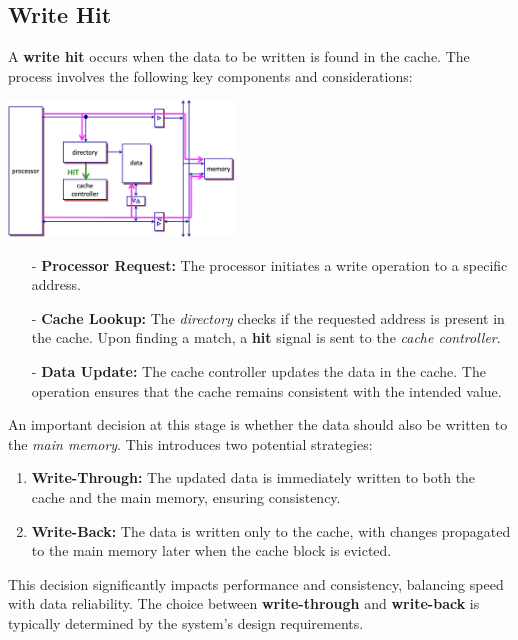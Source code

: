 \subsection{Write Hit}
A \textbf{write hit} occurs when the data to be written is found in the cache. The process involves the following key components and considerations:
\begin{center}
    \includegraphics[width=0.45\textwidth]{chapters/chapter3a/images/write_hit.png}
\end{center}

\begin{itemize}
    \item[-] \textbf{Processor Request:} The processor initiates a write operation to a specific address.
    \item[-] \textbf{Cache Lookup:} The \textit{directory} checks if the requested address is present in the cache. Upon finding a match, a \textbf{hit} signal is sent to the \textit{cache controller}.
    \item[-] \textbf{Data Update:} The cache controller updates the data in the cache. The operation ensures that the cache remains consistent with the intended value.
\end{itemize}

An important decision at this stage is whether the data should also be written to the \textit{main memory}. This introduces two potential strategies:
\begin{enumerate}
    \item \textbf{Write-Through:} The updated data is immediately written to both the cache and the main memory, ensuring consistency.
    \item \textbf{Write-Back:} The data is written only to the cache, with changes propagated to the main memory later when the cache block is evicted.
\end{enumerate}
This decision significantly impacts performance and consistency, balancing speed with data reliability. The choice between \textbf{write-through} and \textbf{write-back} is typically determined by the system's design requirements.

